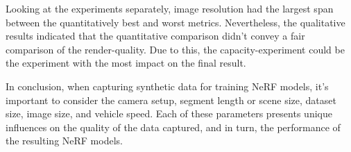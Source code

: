 Looking at the experiments separately, image resolution had the largest span between the quantitatively best and worst metrics. Nevertheless, the qualitative results indicated that the quantitative comparison didn't convey a fair comparison of the render-quality. Due to this, the capacity-experiment could be the experiment with the most impact on the final result.

In conclusion, when capturing synthetic data for training NeRF models, it's important to consider the camera setup, segment length or scene size, dataset size, image size, and vehicle speed. Each of these parameters presents unique influences on the quality of the data captured, and in turn, the performance of the resulting NeRF models.


\begin{comment}
The critical factors that must be considered when capturing synthetic data for training NeRF models, as inferred from the discussed baseline experiments, encompass camera setup, capacity, number of frames, image size, and vehicle speed. Each of these factors demonstrates a unique impact on the performance of the resulting models.

Camera setup plays a significant role in determining the quality of data captured for NeRF models. The experiments revealed that certain camera arrangements, specifically a setup with two cameras at -10$^{\circ}$ and 10$^{\circ}$ yaw, can result in superior SSIM and LPIPS scores, indicating more visually similar and perceptually pleasing images. This finding can be attributed to the degree of overlap between images captured by each camera in the setup. However, the experiments also highlight that camera arrangements were arbitrary and future research may investigate more realistic setups to better generalize the results.

The capacity, or the length of the road segment covered, also impacts the performance of the NeRF models. Even though longer segments led to lower scores across the metrics, these were still selected as the baseline to ensure a diverse range of environmental exposure for the model. It was noticed that the quality of renders deteriorated, especially in terms of increased blur, as segment length increased. Hence, the capacity of data has implications on the clarity and diversity of the training set, which could potentially influence the robustness of the model to diverse scenarios.

The number of frames in the dataset is another crucial factor. An optimal balance between the number of images and the image resolution is important for efficient training. In the experiments, a dataset with 225 images, each with a resolution of $600 \times 450$, covered approximately all of the input pixels by the end of training. However, a dataset with too many or too few images could result in either underutilization or overutilization of the pixels during training. Additionally, a decrease in PSNR with a drop in the number of frames points to the role of variety in the dataset.


\end{comment}
